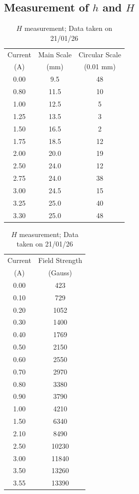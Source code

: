 \documentclass[%
 sor,
 jor,
 amsmath,amssymb,
 reprint,
]{revtex4-2}
\begin{document}
\subsection{Measurement of $h$ and $H$}
\begin{table}[H]
\begin{minipage}{0.48\textwidth}
\centering
\begin{tabular}{|c|c|c|}
\hline
Current & Main Scale & Circular Scale \\
(A) & (mm) & (0.01 mm) \\
\hline
0.00    & 9.5  & 48 \\
0.80  & 11.5 & 10 \\
1.00    & 12.5 & 5  \\
1.25 & 13.5 & 3  \\
1.50  & 16.5 & 2  \\
1.75 & 18.5 & 12 \\
2.00    & 20.0 & 19 \\
2.50  & 24.0   & 12 \\
2.75 & 24.0   & 38 \\
3.00    & 24.5 & 15 \\
3.25 & 25.0   & 40 \\
3.30  & 25.0   & 48 \\
\hline
\end{tabular}
\caption{$\Delta h$ measurement; Data taken on 21/01/26}
\end{minipage}
\hfill
\begin{minipage}{0.48\textwidth}
\centering
\begin{tabular}{|c|c|}
\hline
Current & Field Strength \\
(A) & (Gauss) \\
\hline
0.00  & 423  \\
0.10  & 729  \\
0.20  & 1052 \\
0.30  & 1400 \\
0.40  & 1769 \\
0.50  & 2150 \\
0.60  & 2550 \\
0.70  & 2970 \\
0.80  & 3380 \\
0.90  & 3790 \\
1.00  & 4210 \\
1.50  & 6340 \\
2.10  & 8490 \\
2.50  & 10230 \\
3.00  & 11840 \\
3.50  & 13260 \\
3.55 & 13390 \\
\hline
\end{tabular}
\caption{$H$ measurement; Data taken on 21/01/26}
\end{minipage}
\end{table}
\end{document}

